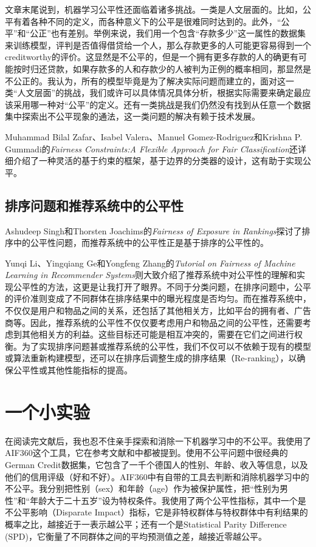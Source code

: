 \documentclass{article}
\begin{document}
文章末尾说到，机器学习公平性还面临着诸多挑战。一类是人文层面的。比如，公平有着各种不同的定义，而各种意义下的公平是很难同时达到的。此外，“公平”和“公正”也有差别。举例来说，我们用一个包含“存款多少”这一属性的数据集来训练模型，评判是否值得借贷给一个人，那么存款更多的人可能更容易得到一个creditworthy的评价。这显然是不公平的，但是一个拥有更多存款的人的确更有可能按时归还贷款，如果存款多的人和存款少的人被判为正例的概率相同，那显然是不公正的。我认为，所有的模型毕竟是为了解决实际问题而建立的，面对这一类“人文层面”的挑战，我们或许可以具体情况具体分析，根据实际需要来确定最应该采用哪一种对“公平”的定义。还有一类挑战是我们仍然没有找到从任意一个数据集中探索出不公平现象的通法，这一类问题的解决有赖于技术发展。

Muhammad Bilal Zafar、Isabel Valera、Manuel Gomez-Rodriguez和Krishna P. Gummadi的\textit{Fairness Constraints:A Flexible Approach for Fair Classification}\cite{2}还详细介绍了一种灵活的基于约束的框架，基于边界的分类器的设计，这有助于实现公平。

\subsection{排序问题和推荐系统中的公平性}
Ashudeep Singh和Thorsten Joachims的\textit{Fairness of Exposure in Rankings}\cite{3}探讨了排序中的公平性问题，而推荐系统中的公平性正是基于排序的公平性的。

Yunqi Li、Yingqiang Ge和Yongfeng Zhang的\textit{Tutorial on Fairness of Machine Learning in Recommender Systems}\cite{4}则大致介绍了推荐系统中对公平性的理解和实现公平性的方法，这更是让我打开了眼界。不同于分类问题，在排序问题中，公平的评价准则变成了不同群体在排序结果中的曝光程度是否均匀。而在推荐系统中，不仅仅是用户和物品之间的关系，还包括了其他相关方，比如平台的拥有者、广告商等。因此，推荐系统的公平性不仅仅要考虑用户和物品之间的公平性，还需要考虑到其他相关方的利益。这些目标还可能是相互冲突的，需要在它们之间进行权衡。为了实现排序问题甚或推荐系统的公平性，我们不仅可以不依赖于现有的模型或算法重新构建模型，还可以在排序后调整生成的排序结果（Re-ranking），以确保公平性或其他性能指标的提高。

\section{一个小实验}
在阅读完文献后，我也忍不住亲手探索和消除一下机器学习中的不公平。我使用了AIF360这个工具，它在参考文献\cite{1}和\cite{4}中都被提到。使用不公平问题中很经典的German Credit数据集，它包含了一千个德国人的性别、年龄、收入等信息，以及他们的信用评级（好和不好）。AIF360中有自带的工具去判断和消除机器学习中的不公平。我分别把性别（sex）和年龄（age）作为被保护属性，把“性别为男性”和“年龄大于二十五岁”设为特权条件。我使用了两个公平性指标，其中一个是不公平影响（Disparate Impact）指标，它是非特权群体与特权群体中有利结果的概率之比，越接近于一表示越公平；还有一个是Statistical Parity Difference (SPD)，它衡量了不同群体之间的平均预测值之差，越接近零越公平。
\end{document}
